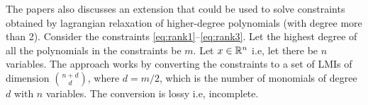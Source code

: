 The papers also discusses an extension that could be used to solve constraints obtained by lagrangian relaxation of higher-degree polynomials (with degree more than 2). Consider the constraints \ref{eq:rank1}--\ref{eq:rank3}. Let the highest degree of all the polynomials in the constraints be $m$. Let $x \in \mathbb{R}^n$ i.e, let there be $n$ variables. The approach works by converting the constraints to a set of LMIs of dimension ${ n+ d \choose d}$, where $d = m/2$, which is the number of monomials of degree $d$ with $n$ variables. The conversion is lossy i.e, incomplete.

